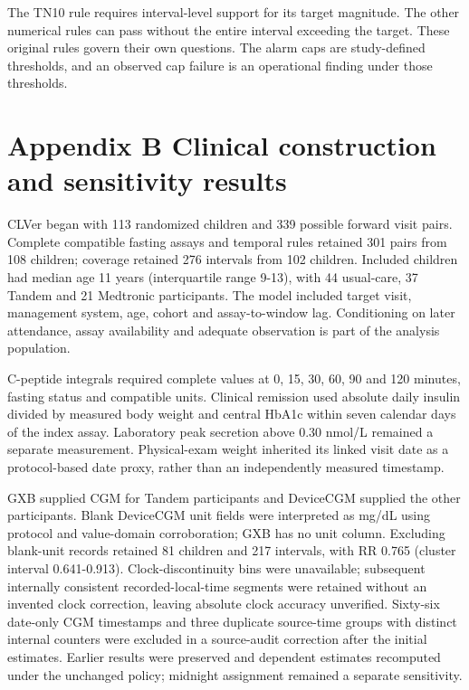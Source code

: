 \documentclass[
  american,
  11pt,
  letterpaper,
]{article}
\begin{document}
The TN10 rule requires interval-level support for its target magnitude.
The other numerical rules can pass without the entire interval exceeding
the target. These original rules govern their own questions. The alarm
caps are study-defined thresholds, and an observed cap failure is an
operational finding under those thresholds.

\section{Appendix B Clinical construction and sensitivity
results}\label{appendix-b-clinical-construction-and-sensitivity-results}

CLVer began with 113 randomized children and 339 possible forward visit
pairs. Complete compatible fasting assays and temporal rules retained
301 pairs from 108 children; coverage retained 276 intervals from 102
children. Included children had median age 11 years (interquartile range
9-13), with 44 usual-care, 37 Tandem and 21 Medtronic participants. The
model included target visit, management system, age, cohort and
assay-to-window lag. Conditioning on later attendance, assay
availability and adequate observation is part of the analysis
population.

C-peptide integrals required complete values at 0, 15, 30, 60, 90 and
120 minutes, fasting status and compatible units. Clinical remission
used absolute daily insulin divided by measured body weight and central
HbA1c within seven calendar days of the index assay. Laboratory peak
secretion above 0.30 nmol/L remained a separate measurement.
Physical-exam weight inherited its linked visit date as a protocol-based
date proxy, rather than an independently measured timestamp.

GXB supplied CGM for Tandem participants and DeviceCGM supplied the
other participants. Blank DeviceCGM unit fields were interpreted as
mg/dL using protocol and value-domain corroboration; GXB has no unit
column. Excluding blank-unit records retained 81 children and 217
intervals, with RR 0.765 (cluster interval 0.641-0.913).
Clock-discontinuity bins were unavailable; subsequent internally
consistent recorded-local-time segments were retained without an
invented clock correction, leaving absolute clock accuracy unverified.
Sixty-six date-only CGM timestamps and three duplicate source-time
groups with distinct internal counters were excluded in a source-audit
correction after the initial estimates. Earlier results were preserved
and dependent estimates recomputed under the unchanged policy; midnight
assignment remained a separate sensitivity.
\end{document}
